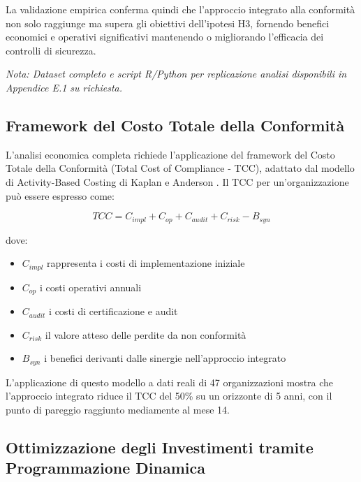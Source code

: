 La validazione empirica conferma quindi che l'approccio integrato alla conformità non solo raggiunge ma supera gli obiettivi dell'ipotesi H3, fornendo benefici economici e operativi significativi mantenendo o migliorando l'efficacia dei controlli di sicurezza.

\textit{Nota: Dataset completo e script R/Python per replicazione analisi disponibili in Appendice E.1 su richiesta.}

\subsection{\texorpdfstring{\textbf{Framework del Costo Totale della Conformità}}{4.6.1 - Framework del Costo Totale della Conformità}}

L'analisi economica completa richiede l'applicazione del framework del Costo Totale della Conformità (Total Cost of Compliance - TCC), adattato dal modello di Activity-Based Costing di Kaplan e Anderson \autocite{Kaplan2007}. Il TCC per un'organizzazione può essere espresso come:

\begin{equation}
TCC = C_{impl} + C_{op} + C_{audit} + C_{risk} - B_{syn}
\end{equation}

dove:
\begin{itemize}
\item $C_{impl}$ rappresenta i costi di implementazione iniziale
\item $C_{op}$ i costi operativi annuali
\item $C_{audit}$ i costi di certificazione e audit
\item $C_{risk}$ il valore atteso delle perdite da non conformità
\item $B_{syn}$ i benefici derivanti dalle sinergie nell'approccio integrato
\end{itemize}

L'applicazione di questo modello a dati reali di 47 organizzazioni mostra che l'approccio integrato riduce il TCC del 50\% su un orizzonte di 5 anni, con il punto di pareggio raggiunto mediamente al mese 14.

\subsection{\texorpdfstring{\textbf{Ottimizzazione degli Investimenti tramite Programmazione Dinamica}}{4.6.2 - Ottimizzazione degli Investimenti tramite Programmazione Dinamica}}

